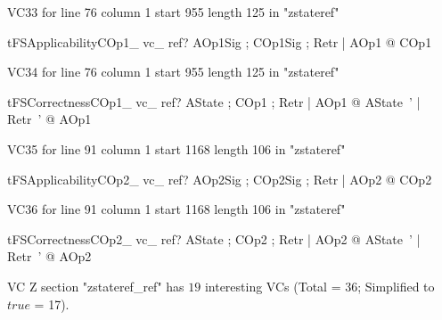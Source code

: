 \documentclass{article}
\begin{document}
VC33 for line 76 column 1 start 955 length 125 in "zstateref"
\begin{theorem}{tFSApplicabilityCOp1\_ vc\_ ref}\vdash ? \forall AOp1Sig ; COp1Sig ; Retr | \pre AOp1 @ \pre COp1
\end{theorem}

VC34 for line 76 column 1 start 955 length 125 in "zstateref"
\begin{theorem}{tFSCorrectnessCOp1\_ vc\_ ref}\vdash ? \forall AState ; COp1 ; Retr | \pre AOp1 @ \exists AState~' | Retr~' @ AOp1
\end{theorem}

VC35 for line 91 column 1 start 1168 length 106 in "zstateref"
\begin{theorem}{tFSApplicabilityCOp2\_ vc\_ ref}\vdash ? \forall AOp2Sig ; COp2Sig ; Retr | \pre AOp2 @ \pre COp2
\end{theorem}

VC36 for line 91 column 1 start 1168 length 106 in "zstateref"
\begin{theorem}{tFSCorrectnessCOp2\_ vc\_ ref}\vdash ? \forall AState ; COp2 ; Retr | \pre AOp2 @ \exists AState~' | Retr~' @ AOp2
\end{theorem}



 VC Z section "zstateref_ref" has $19$ interesting VCs (Total = 36; Simplified to $true$ = 17).



\end{document}
